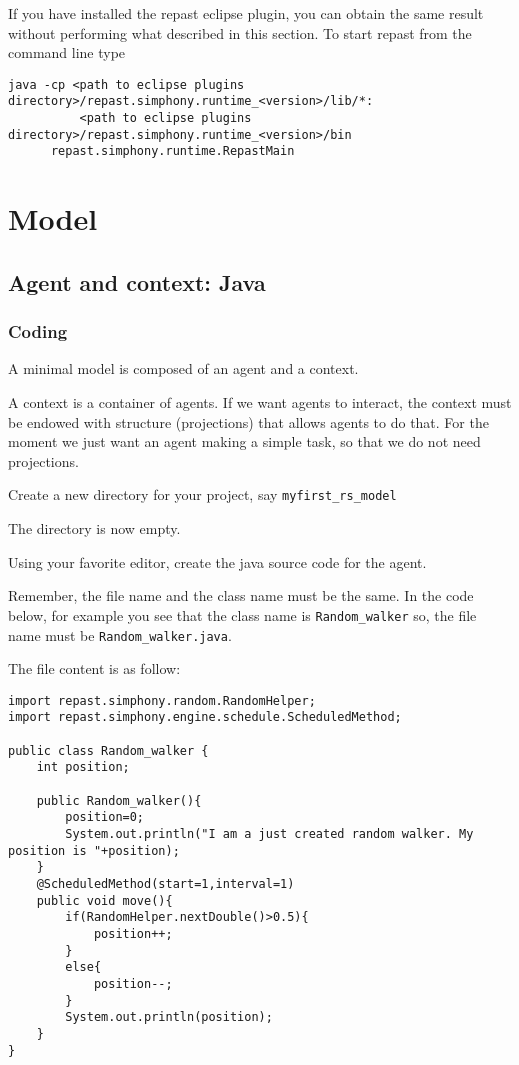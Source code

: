 \documentclass{article}
\begin{document}
If you have installed the repast eclipse plugin, you can obtain the same result without performing what described in this section. To start repast from the command line type

\begin{verbatim}
java -cp <path to eclipse plugins directory>/repast.simphony.runtime_<version>/lib/*:
          <path to eclipse plugins directory>/repast.simphony.runtime_<version>/bin 
	  repast.simphony.runtime.RepastMain
\end{verbatim}


\section{Model}
\subsection{Agent and context: Java}
\subsubsection{Coding}
A minimal model is composed of an agent and a context.

A context is a container of agents. If we want agents to interact, the context must be endowed with structure (projections) that allows agents to do that. For the moment we just want an agent making a simple task, so that we do not need projections.

Create a new directory for your project, say \verb+myfirst_rs_model+

The directory is now empty.

Using your favorite editor, create the java source code for the agent.

Remember, the file name and the class name must be the same. In the code below, for example you see that the class name is \verb+Random_walker+  so, the file name must be \verb+Random_walker.java+.

The file content is as follow:

\begin{verbatim}
import repast.simphony.random.RandomHelper;
import repast.simphony.engine.schedule.ScheduledMethod;

public class Random_walker {
	int position;
	
	public Random_walker(){
		position=0;
		System.out.println("I am a just created random walker. My position is "+position);
	}
	@ScheduledMethod(start=1,interval=1)
	public void move(){
		if(RandomHelper.nextDouble()>0.5){
			position++;
		}
		else{
			position--;
		}
		System.out.println(position);
	}
}
\end{verbatim}
\end{document}
